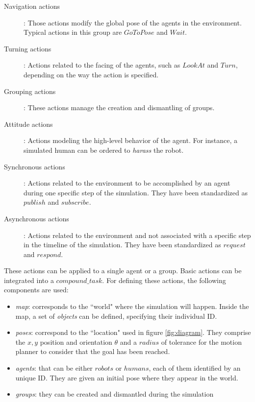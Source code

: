 \begin{description}
    \item[Navigation actions]: Those actions modify the global pose of the agents in the environment. Typical actions in this group are $GoToPose$ and $Wait$.
    \item[Turning actions]: Actions related to the facing of the agents, such as $LookAt$ and $Turn$, depending on the way the action is specified.
    \item[Grouping actions]: These actions manage the creation and dismantling of groups.
    \item[Attitude actions]: Actions modeling the high-level behavior of the agent. For instance, a simulated human can be ordered to \textit{harass} the robot.
    \item[Synchronous actions]: Actions related to the environment to be accomplished by an agent during one specific step of the simulation. They have been standardized as $publish$ and $subscribe$.
    \item[Asynchronous actions]: Actions related to the environment and not associated with a specific step in the timeline of the simulation. They have been standardized as $request$ and $respond$.
\end{description}

These actions can be applied to a single agent or a group. Basic actions can be integrated into a $compound\_task$. For defining these actions, the following components are used:
\begin{itemize}
    \item \emph{map}: corresponds to the ``world" where the simulation will happen. Inside the map, a set of \emph{objects} can be defined, specifying their individual ID.
    \item \emph{poses}: correspond to the ``location" used in figure \ref{fig:diagram}. They comprise the $x,y$ position and orientation $\theta$ and a $radius$ of tolerance for the motion planner to consider that the goal has been reached.
    \item \emph{agents}: that can be either $robots$ or $humans$, each of them identified by an unique ID. They are given an initial pose where they appear in the world.
    \item \emph{groups}: they can be created and dismantled during the simulation
\end{itemize}

